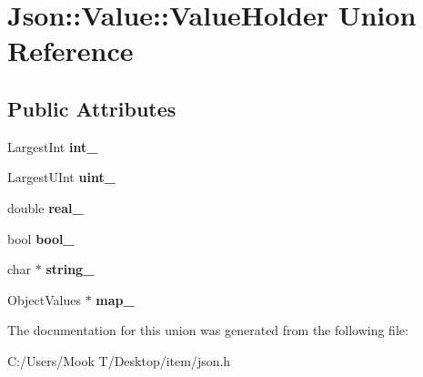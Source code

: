 \hypertarget{union_json_1_1_value_1_1_value_holder}{}\section{Json\+:\+:Value\+:\+:Value\+Holder Union Reference}
\label{union_json_1_1_value_1_1_value_holder}
\subsection*{Public Attributes}
\begin{DoxyCompactItemize}
\item 
\hypertarget{union_json_1_1_value_1_1_value_holder_adbfb384301298844ed955ba5cf6015a0}{}Largest\+Int {\bfseries int\+\_\+}\label{union_json_1_1_value_1_1_value_holder_adbfb384301298844ed955ba5cf6015a0}

\item 
\hypertarget{union_json_1_1_value_1_1_value_holder_aab65665dc15a24a29a8e93cdeeaa7e50}{}Largest\+U\+Int {\bfseries uint\+\_\+}\label{union_json_1_1_value_1_1_value_holder_aab65665dc15a24a29a8e93cdeeaa7e50}

\item 
\hypertarget{union_json_1_1_value_1_1_value_holder_af0c5ca724e5fe3a15db773d750e2351e}{}double {\bfseries real\+\_\+}\label{union_json_1_1_value_1_1_value_holder_af0c5ca724e5fe3a15db773d750e2351e}

\item 
\hypertarget{union_json_1_1_value_1_1_value_holder_a92edab1861dadbfefd8be5fd4285eefe}{}bool {\bfseries bool\+\_\+}\label{union_json_1_1_value_1_1_value_holder_a92edab1861dadbfefd8be5fd4285eefe}

\item 
\hypertarget{union_json_1_1_value_1_1_value_holder_a70ac2b153bc405527baa3850d2ddc3cb}{}char $\ast$ {\bfseries string\+\_\+}\label{union_json_1_1_value_1_1_value_holder_a70ac2b153bc405527baa3850d2ddc3cb}

\item 
\hypertarget{union_json_1_1_value_1_1_value_holder_a1e7a5b86d4f52234f55c847ad1ce389a}{}Object\+Values $\ast$ {\bfseries map\+\_\+}\label{union_json_1_1_value_1_1_value_holder_a1e7a5b86d4f52234f55c847ad1ce389a}

\end{DoxyCompactItemize}


The documentation for this union was generated from the following file\+:\begin{DoxyCompactItemize}
\item 
C\+:/\+Users/\+Mook T/\+Desktop/item/json.\+h\end{DoxyCompactItemize}
